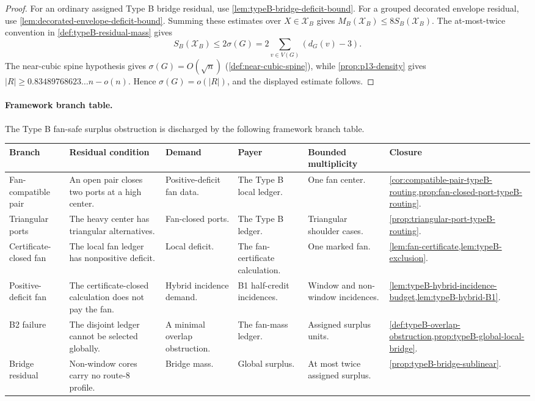 \documentclass[11pt]{article}
\newcommand{\FrameworkBranchTableHeader}{%
\toprule
\textbf{Branch} & \textbf{Residual condition} & \textbf{Demand} & \textbf{Payer} & \textbf{Bounded multiplicity} & \textbf{Closure}\\
\midrule
}
\begin{document}
\begin{proof}
For an ordinary assigned Type B bridge residual, use
\cref{lem:typeB-bridge-deficit-bound}.  For a grouped decorated envelope
residual, use
\cref{lem:decorated-envelope-deficit-bound}.  Summing these estimates over
\(X\in\mathcal X_B\) gives \(M_B(\mathcal X_B)\le8S_B(\mathcal X_B)\).  The
at-most-twice convention in \cref{def:typeB-residual-mass} gives
\[
S_B(\mathcal X_B)\le
2\sigma(G)=2\sum_{v\in V(G)}(d_G(v)-3).
\]
The near-cubic spine hypothesis gives
$\sigma(G)=O(\sqrt n)$
(\cref{def:near-cubic-spine}), while
\cref{prop:p13-density} gives $|R|\ge0.83489768623\ldots n-o(n)$.  Hence
$\sigma(G)=o(|R|)$, and the displayed estimate follows.
\end{proof}

\paragraph{Framework branch table.}
The Type B fan-safe surplus obstruction is discharged by the following
framework branch table.
\begin{longtable}{L{0.13\textwidth} L{0.19\textwidth} L{0.14\textwidth} L{0.14\textwidth} L{0.17\textwidth} L{0.17\textwidth}}
\FrameworkBranchTableHeader
Fan-compatible pair
&
An open pair closes two ports at a high center.
&
Positive-deficit fan data.
&
The Type B local ledger.
&
One fan center.
&
\cref{cor:compatible-pair-typeB-routing,prop:fan-closed-port-typeB-routing}.
\\
\addlinespace
Triangular ports
&
The heavy center has triangular alternatives.
&
Fan-closed ports.
&
The Type B ledger.
&
Triangular shoulder cases.
&
\cref{prop:triangular-port-typeB-routing}.
\\
\addlinespace
Certificate-closed fan
&
The local fan ledger has nonpositive deficit.
&
Local deficit.
&
The fan-certificate calculation.
&
One marked fan.
&
\cref{lem:fan-certificate,lem:typeB-exclusion}.
\\
\addlinespace
Positive-deficit fan
&
The certificate-closed calculation does not pay the fan.
&
Hybrid incidence demand.
&
B1 half-credit incidences.
&
Window and non-window incidences.
&
\cref{lem:typeB-hybrid-incidence-budget,lem:typeB-hybrid-B1}.
\\
\addlinespace
B2 failure
&
The disjoint ledger cannot be selected globally.
&
A minimal overlap obstruction.
&
The fan-mass ledger.
&
Assigned surplus units.
&
\cref{def:typeB-overlap-obstruction,prop:typeB-global-local-bridge}.
\\
\addlinespace
Bridge residual
&
Non-window cores carry no route-8 profile.
&
Bridge mass.
&
Global surplus.
&
At most twice assigned surplus.
&
\cref{prop:typeB-bridge-sublinear}.
\\
\bottomrule
\end{longtable}
\end{document}
